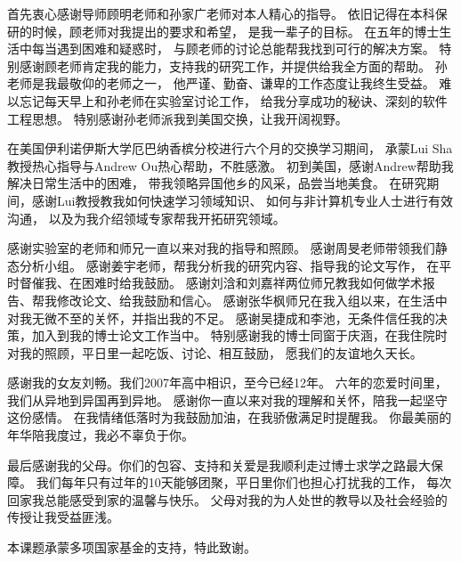 \begin{acknowledgement}
  首先衷心感谢导师顾明老师和孙家广老师对本人精心的指导。
  依旧记得在本科保研的时候，顾老师对我提出的要求和希望，
  是我一辈子的目标。
  在五年的博士生活中每当遇到困难和疑惑时，
  与顾老师的讨论总能帮我找到可行的解决方案。
  特别感谢顾老师肯定我的能力，支持我的研究工作，并提供给我全方面的帮助。
  孙老师是我最敬仰的老师之一，
  他严谨、勤奋、谦卑的工作态度让我终生受益。
  难以忘记每天早上和孙老师在实验室讨论工作，
  给我分享成功的秘诀、深刻的软件工程思想。
  特别感谢孙老师派我到美国交换，让我开阔视野。

  
  在美国伊利诺伊斯大学厄巴纳香槟分校进行六个月的交换学习期间，
  承蒙Lui Sha教授热心指导与Andrew Ou热心帮助，不胜感激。
  初到美国，感谢Andrew帮助我解决日常生活中的困难，
  带我领略异国他乡的风采，品尝当地美食。
  在研究期间，感谢Lui教授教我如何快速学习领域知识、
  如何与非计算机专业人士进行有效沟通，
  以及为我介绍领域专家帮我开拓研究领域。
  

  感谢实验室的老师和师兄一直以来对我的指导和照顾。
  感谢周旻老师带领我们静态分析小组。
  感谢姜宇老师，帮我分析我的研究内容、指导我的论文写作，
  在平时督催我、在困难时给我鼓励。
  感谢刘浛和刘嘉祥两位师兄教我如何做学术报告、帮我修改论文、给我鼓励和信心。
  感谢张华枫师兄在我入组以来，在生活中对我无微不至的关怀，并指出我的不足。  
  感谢吴捷成和李池，无条件信任我的决策，加入到我的博士论文工作当中。
  特别感谢我的博士同窗于庆涵，在我住院时对我的照顾，平日里一起吃饭、讨论、相互鼓励，
  愿我们的友谊地久天长。
  
  
  感谢我的女友刘畅。我们2007年高中相识，至今已经12年。
  六年的恋爱时间里，我们从异地到异国再到异地。
  感谢你一直以来对我的理解和关怀，陪我一起坚守这份感情。
  在我情绪低落时为我鼓励加油，在我骄傲满足时提醒我。
  你最美丽的年华陪我度过，我必不辜负于你。
  
  最后感谢我的父母。你们的包容、支持和关爱是我顺利走过博士求学之路最大保障。
  我们每年只有过年的10天能够团聚，平日里你们也担心打扰我的工作，
  每次回家我总能感受到家的温馨与快乐。
  父母对我的为人处世的教导以及社会经验的传授让我受益匪浅。
  
  本课题承蒙多项国家基金的支持，特此致谢。
\end{acknowledgement}

